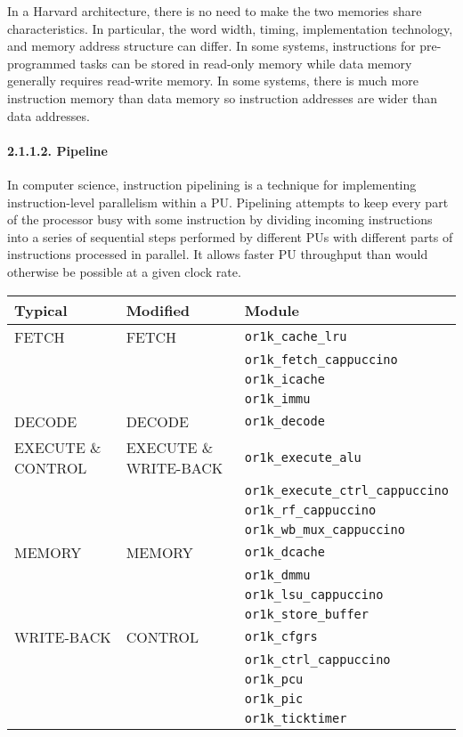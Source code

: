 \documentclass[]{article}
\let\oldparagraph\paragraph
\renewcommand{\paragraph}[1]{\oldparagraph{#1}\mbox{}}
\begin{document}
In a Harvard architecture, there is no need to make the two memories
share characteristics. In particular, the word width, timing,
implementation technology, and memory address structure can differ. In
some systems, instructions for pre-programmed tasks can be stored in
read-only memory while data memory generally requires read-write memory.
In some systems, there is much more instruction memory than data memory
so instruction addresses are wider than data addresses.

\paragraph{2.1.1.2. Pipeline}\label{pipeline}

In computer science, instruction pipelining is a technique for
implementing instruction-level parallelism within a PU. Pipelining
attempts to keep every part of the processor busy with some instruction
by dividing incoming instructions into a series of sequential steps
performed by different PUs with different parts of instructions
processed in parallel. It allows faster PU throughput than would
otherwise be possible at a given clock rate.

\begin{longtable}[]{@{}lll@{}}
\toprule
Typical & Modified & Module\tabularnewline
\midrule
\endhead
FETCH & FETCH & \texttt{or1k\_cache\_lru}\tabularnewline
& & \texttt{or1k\_fetch\_cappuccino}\tabularnewline
& & \texttt{or1k\_icache}\tabularnewline
& & \texttt{or1k\_immu}\tabularnewline
DECODE & DECODE & \texttt{or1k\_decode}\tabularnewline
EXECUTE \& CONTROL & EXECUTE \& WRITE-BACK &
\texttt{or1k\_execute\_alu}\tabularnewline
& & \texttt{or1k\_execute\_ctrl\_cappuccino}\tabularnewline
& & \texttt{or1k\_rf\_cappuccino}\tabularnewline
& & \texttt{or1k\_wb\_mux\_cappuccino}\tabularnewline
MEMORY & MEMORY & \texttt{or1k\_dcache}\tabularnewline
& & \texttt{or1k\_dmmu}\tabularnewline
& & \texttt{or1k\_lsu\_cappuccino}\tabularnewline
& & \texttt{or1k\_store\_buffer}\tabularnewline
WRITE-BACK & CONTROL & \texttt{or1k\_cfgrs}\tabularnewline
& & \texttt{or1k\_ctrl\_cappuccino}\tabularnewline
& & \texttt{or1k\_pcu}\tabularnewline
& & \texttt{or1k\_pic}\tabularnewline
& & \texttt{or1k\_ticktimer}\tabularnewline
\bottomrule
\end{longtable}
\end{document}
